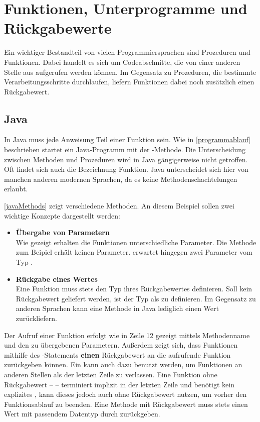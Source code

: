\section{Funktionen, Unterprogramme und Rückgabewerte}
Ein wichtiger Bestandteil von vielen Programmiersprachen sind Prozeduren und Funktionen. Dabei handelt es sich um Codeabschnitte, die von einer anderen Stelle aus aufgerufen werden können. Im Gegensatz zu Prozeduren, die bestimmte Verarbeitungsschritte durchlaufen, liefern Funktionen dabei noch zusätzlich einen Rückgabewert.

\subsection*{Java}
In Java muss jede Anweisung Teil einer Funktion sein. Wie in \autoref{programmablauf} beschrieben startet ein Java-Programm mit der -Methode. Die Unterscheidung zwischen Methoden und Prozeduren wird in Java gängigerweise nicht getroffen. Oft findet sich auch die Bezeichnung Funktion. Java unterscheidet sich hier von manchen anderen modernen Sprachen, da es keine Methodenschachtelungen erlaubt.

\autoref{javaMethods} zeigt verschiedene Methoden. An diesem Beispiel sollen zwei wichtige Konzepte dargestellt werden: 
\begin{itemize}
    \item \textbf{Übergabe von Parametern}\\
    Wie gezeigt erhalten die Funktionen unterschiedliche Parameter. Die Methode  zum Beipiel erhält keinen Parameter.  erwartet hingegen   zwei Parameter vom Typ .
    \item \textbf{Rückgabe eines Wertes}\\
    Eine Funktion muss stets den Typ ihres Rückgabewertes definieren. Soll kein Rückgabewert geliefert werden, ist der Typ als  zu definieren. Im Gegensatz zu anderen Sprachen kann eine Methode in Java lediglich einen Wert zurückliefern.
\end{itemize}
Der Aufruf einer Funktion erfolgt wie in Zeile 12 gezeigt mittels Methodenname und den zu übergebenen Parametern. Außerdem zeigt sich, dass Funktionen mithilfe des -Statements \textbf{einen} Rückgabewert an die aufrufende Funktion zurückgeben können. Ein  kann auch dazu benutzt werden, um Funktionen an anderen Stellen als der letzten Zeile zu verlassen. Eine Funktion ohne Rückgabewert --  -- terminiert implizit in der letzten Zeile und benötigt kein explizites , kann dieses jedoch auch ohne Rückgabewert nutzen, um vorher den Funktionsablauf zu beenden. Eine Methode mit Rückgabewert muss stets einen Wert mit passendem Datentyp durch  zurückgeben.

